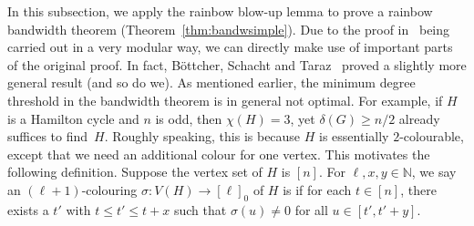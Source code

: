 \documentclass[10pt]{amsart}
\theoremstyle{definition}
\theoremstyle{claimstyle}
\theoremstyle{stepstyle}
\numberwithin{equation}{section}
\begin{document}

In this subsection, we apply the rainbow blow-up lemma to prove a rainbow bandwidth theorem (Theorem~\ref{thm:bandwsimple}). Due to the proof in~\cite{BST:09} being carried out in a very modular way, we can directly make use of important parts of the original proof.
In fact, B\"ottcher, Schacht and Taraz~\cite{BST:09} proved a slightly more general result (and so do we). As mentioned earlier, the minimum degree threshold in the bandwidth theorem is in general not optimal. For example, if $H$ is a Hamilton cycle and $n$ is odd, then $\chi(H)=3$, yet $\delta(G)\ge n/2$ already suffices to find~$H$. Roughly speaking, this is because $H$ is essentially $2$-colourable, except that we need an additional colour for one vertex. This motivates the following definition.
Suppose the vertex set of $H$ is $[n]$.
For $\ell,x,y\in \mathbb{N}$,
we say an $(\ell + 1)$-colouring $\sigma\colon V (H) \to [\ell]_0$ of $H$ is 
if for each $t \in [n]$,
there exists a $t'$ with $t \leq  t' \leq t+x$ such that $\sigma(u) \neq 0$ for all $u \in [t', t'+y]$.
\end{document}
